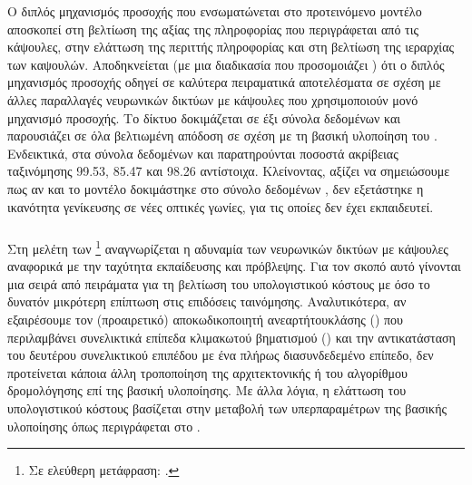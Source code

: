 Ο διπλός μηχανισμός προσοχής που ενσωματώνεται στο προτεινόμενο μοντέλο αποσκοπεί στη βελτίωση της αξίας της πληροφορίας που περιγράφεται από τις κάψουλες, στην ελάττωση της περιττής πληροφορίας και στη βελτίωση της ιεραρχίας των καψουλών. Αποδηκνείεται (με μια διαδικασία που προσομοιάζει ) ότι ο διπλός μηχανισμός προσοχής οδηγεί σε καλύτερα πειραματικά αποτελέσματα σε σχέση με άλλες παραλλαγές νευρωνικών δικτύων με κάψουλες που χρησιμοποιούν μονό μηχανισμό προσοχής. Το δίκτυο δοκιμάζεται σε έξι σύνολα δεδομένων και παρουσιάζει σε όλα βελτιωμένη απόδοση σε σχέση με τη βασική υλοποίηση του \cite{sabour2017dynamic}. Ενδεικτικά, στα σύνολα δεδομένων  και  παρατηρούνται ποσοστά ακρίβειας ταξινόμησης 99.53, 85.47 και 98.26 αντίστοιχα. Κλείνοντας, αξίζει να σημειώσουμε πως αν και το μοντέλο δοκιμάστηκε στο σύνολο δεδομένων , δεν εξετάστηκε η ικανότητα γενίκευσης σε νέες οπτικές γωνίες, για τις οποίες δεν έχει εκπαιδευτεί.

\subsubsection{}

Στη μελέτη των  \footnote{Σε ελεύθερη μετάφραση: .} \cite{shiri2020quick} αναγνωρίζεται η αδυναμία των νευρωνικών δικτύων με κάψουλες αναφορικά με την ταχύτητα εκπαίδευσης και πρόβλεψης. Για τον σκοπό αυτό γίνονται μια σειρά από πειράματα για τη βελτίωση του υπολογιστικού κόστους με όσο το δυνατόν μικρότερη επίπτωση στις επιδόσεις ταινόμησης. Αναλυτικότερα, αν εξαιρέσουμε τον (προαιρετικό) αποκωδικοποιητή ανεαρτήτου\textendash κλάσης () που περιλαμβάνει συνελικτικά επίπεδα κλιμακωτού βηματισμού () και την αντικατάσταση του δευτέρου συνελικτικού επιπέδου με ένα πλήρως διασυνδεδεμένο επίπεδο, δεν προτείνεται κάποια άλλη τροποποίηση της αρχιτεκτονικής ή του αλγορίθμου δρομολόγησης επί της βασική υλοποίησης. Με άλλα λόγια, η ελάττωση του υπολογιστικού κόστους βασίζεται στην μεταβολή των υπερπαραμέτρων της βασικής υλοποίησης όπως περιγράφεται στο \cite{sabour2017dynamic}. 

